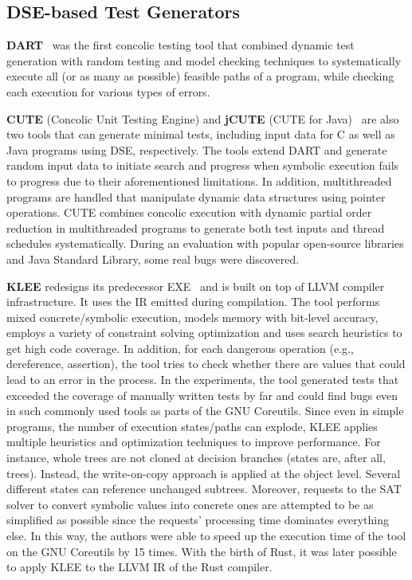 \documentclass{article}
\begin{document}
\subsection{DSE-based Test Generators}
\textbf{DART}~\cite{Godefroid_2005} was the first concolic testing tool that combined dynamic test generation with random testing and model checking techniques to systematically execute all (or as many as possible) feasible paths of a program, while checking each execution for various types of errors.


\textbf{CUTE} (Concolic Unit Testing Engine) and \textbf{jCUTE} (CUTE for Java)~\cite{Sen2006} are also two tools that can generate minimal tests, including input data for C as well as Java programs using \ac{DSE}, respectively. The tools extend DART and generate random input data to initiate search and progress when symbolic execution fails to progress due to their aforementioned limitations. In addition, multithreaded programs are handled that manipulate dynamic data structures using pointer operations. CUTE combines concolic execution with dynamic partial order reduction in multithreaded programs to generate both test inputs and thread schedules systematically. During an evaluation with popular open-source libraries and Java Standard Library, some real bugs were discovered.


\textbf{KLEE} redesigns its predecessor EXE~\cite{Cadar2008} and is built on top of LLVM compiler infrastructure. It uses the \ac{IR} emitted during compilation. The tool performs mixed concrete/symbolic execution, models memory with bit-level accuracy, employs a variety of constraint solving optimization and uses search heuristics to get high code coverage. In addition, for each dangerous operation (e.g., dereference, assertion), the tool tries to check whether there are values that could lead to an error in the process. In the experiments, the tool generated tests that exceeded the coverage of manually written tests by far and could find bugs even in such commonly used tools as parts of the GNU Coreutils. Since even in simple programs, the number of execution states/paths can explode, KLEE applies multiple heuristics and optimization techniques to improve performance. For instance, whole trees are not cloned at decision branches (states are, after all, trees). Instead, the write-on-copy approach is applied at the object level. Several different states can reference unchanged subtrees. Moreover, requests to the SAT solver to convert symbolic values into concrete ones are attempted to be as simplified as possible since the requests' processing time dominates everything else. In this way, the authors were able to speed up the execution time of the tool on the GNU Coreutils by 15 times. With the birth of Rust, it was later possible to apply KLEE to the LLVM IR of the Rust compiler.
\end{document}
